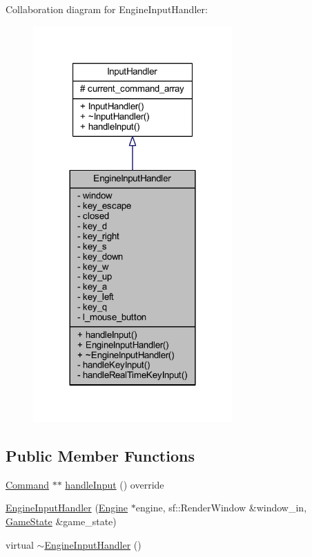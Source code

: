 Collaboration diagram for Engine\+Input\+Handler\+:\nopagebreak
\begin{figure}[H]
\begin{center}
\leavevmode
\includegraphics[width=216pt]{class_engine_input_handler__coll__graph}
\end{center}
\end{figure}
\subsection*{Public Member Functions}
\begin{DoxyCompactItemize}
\item 
\hyperlink{class_command}{Command} $\ast$$\ast$ \hyperlink{class_engine_input_handler_ade92afaf7657007c2be3b5bd745c96e3}{handle\+Input} () override
\item 
\hyperlink{class_engine_input_handler_a0fb16f260399a8f4384001b9ffa352de}{Engine\+Input\+Handler} (\hyperlink{class_engine}{Engine} $\ast$engine, sf\+::\+Render\+Window \&window\+\_\+in, \hyperlink{class_game_state}{Game\+State} \&game\+\_\+state)
\item 
virtual \hyperlink{class_engine_input_handler_a92a875197705110bd6b2debfe7dbee6a}{$\sim$\+Engine\+Input\+Handler} ()
\end{DoxyCompactItemize}
